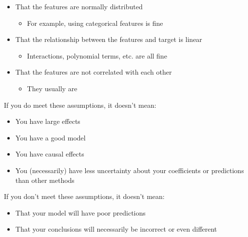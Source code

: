 \documentclass[
  letterpaper,
]{krantz}
\providecommand{\tightlist}{%
  \setlength{\itemsep}{0pt}\setlength{\parskip}{0pt}}\usepackage{longtable,booktabs,array}
\begin{document}
\begin{itemize}
\tightlist
\item
  That the features are normally distributed

  \begin{itemize}
  \tightlist
  \item
    For example, using categorical features is fine
  \end{itemize}
\item
  That the relationship between the features and target is linear

  \begin{itemize}
  \tightlist
  \item
    Interactions, polynomial terms, etc. are all fine
  \end{itemize}
\item
  That the features are not correlated with each other

  \begin{itemize}
  \tightlist
  \item
    They usually are
  \end{itemize}
\end{itemize}

If you do meet these assumptions, it doesn't mean:

\begin{itemize}
\tightlist
\item
  You have large effects
\item
  You have a good model
\item
  You have causal effects
\item
  You (necessarily) have less uncertainty about your coefficients or
  predictions than other methods
\end{itemize}

If you don't meet these assumptions, it doesn't mean:

\begin{itemize}
\tightlist
\item
  That your model will have poor predictions
\item
  That your conclusions will necessarily be incorrect or even different
\end{itemize}
\end{document}
